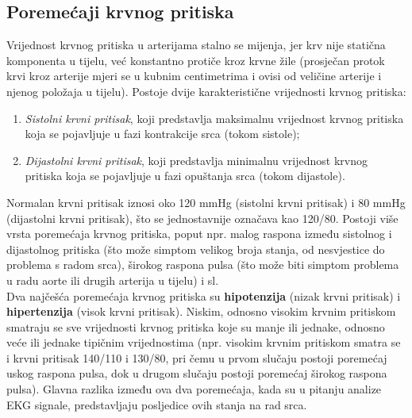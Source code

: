 \documentclass[12pt,a4paper]{article}
\begin{document}
\subsection{Poremećaji krvnog pritiska}

\quad Vrijednost krvnog pritiska u arterijama stalno se mijenja, jer krv nije statična komponenta u tijelu, već konstantno protiče kroz krvne žile (prosječan protok krvi kroz arterije mjeri se u kubnim centimetrima i ovisi od veličine arterije i njenog položaja u tijelu). \cite{blood-pressure}
Postoje dvije karakteristične vrijednosti krvnog pritiska:

\begin{enumerate}

\item \textit{Sistolni krvni pritisak}, koji predstavlja maksimalnu vrijednost krvnog pritiska koja se pojavljuje u fazi kontrakcije srca (tokom sistole);

\item \textit{Dijastolni krvni pritisak}, koji predstavlja minimalnu vrijednost krvnog pritiska koja se pojavljuje u fazi opuštanja srca (tokom dijastole).

\end{enumerate}

Normalan krvni pritisak iznosi oko 120 mmHg (sistolni krvni pritisak) i 80 mmHg (dijastolni krvni pritisak), što se jednostavnije označava kao 120/80. Postoji više vrsta poremećaja krvnog pritiska, poput npr. malog raspona između sistolnog i dijastolnog pritiska (što može simptom velikog broja stanja, od nesvjestice do problema s radom srca), širokog raspona pulsa (što može biti simptom problema u radu aorte ili drugih arterija u tijelu) i sl. \cite{wide-pulse-pressure} \\

Dva najčešća poremećaja krvnog pritiska su \textbf{hipotenzija} (nizak krvni pritisak) i \textbf{hipertenzija} (visok krvni pritisak). Niskim, odnosno visokim krvnim pritiskom smatraju se sve vrijednosti krvnog pritiska koje su manje ili jednake, odnosno veće ili jednake tipičnim vrijednostima (npr. visokim krvnim pritiskom smatra se i krvni pritisak 140/110 i 130/80, pri čemu u prvom slučaju postoji poremećaj uskog raspona pulsa, dok u drugom slučaju postoji poremećaj širokog raspona pulsa). Glavna razlika između ova dva poremećaja, kada su u pitanju analize EKG signale, predstavljaju posljedice ovih stanja na rad srca. \\
\end{document}
